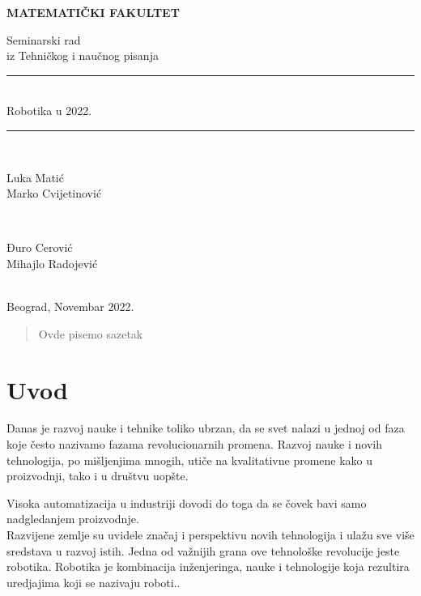 \documentclass{article}
\newcommand{\HRule}{\rule{\linewidth}{0.5mm}}
\begin{document}
	\vspace*{5cm}
	\thispagestyle{empty}
	\centerline{\huge \textbf{MATEMATIČKI FAKULTET}}
	\vspace{2cm}
	
	\begin{center}
		
		{\Large Seminarski rad}\\
		{\Large	iz Tehničkog i naučnog pisanja}\\
		\Huge\HRule\\[0.4cm] %
		{Robotika u 2022.}\\
		\HRule \\[20pt] %
		\begin{minipage}{0.4\textwidth}
			\begin{flushleft} \large
				{\Large Luka Matić}\\
				{\Large Marko Cvijetinović}
			\end{flushleft}
		\end{minipage}
		~
		\begin{minipage}{0.4\textwidth}
			\begin{flushright} \large
				{\Large Đuro Cerović} \\
				{\Large Mihajlo Radojević}\\ 
			\end{flushright}
		\end{minipage}\\[5cm]
		\Large{Beograd, Novembar 2022.}
	\end{center}
	\pagebreak
 \begin{abstract}
     Ovde pisemo sazetak
 \end{abstract}
	\tableofcontents
    \pagebreak
	\section{Uvod}
	
	Danas je razvoj nauke i tehnike toliko ubrzan, da se svet nalazi u jednoj od faza koje često nazivamo fazama revolucionarnih promena. Razvoj nauke i novih tehnologija, po mišljenjima mnogih, utiče na kvalitativne promene kako u proizvodnji, tako i u društvu uopšte.
	
	Visoka automatizacija u industriji dovodi do toga da se čovek bavi samo nadgledanjem proizvodnje.\\
	Razvijene zemlje su uvidele značaj i perspektivu novih tehnologija i ulažu sve više sredstava u razvoj istih. Jedna od važnijih grana ove tehnološke revolucije jeste robotika. Robotika je kombinacija inženjeringa, nauke i tehnologije koja rezultira uredjajima koji se nazivaju roboti..\cite{robotics2022,robots2022}
	
\end{document}
